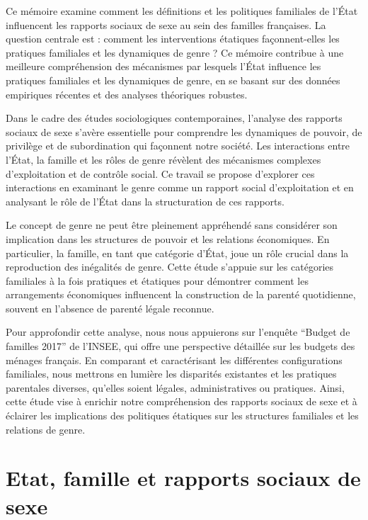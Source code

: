 \documentclass[
  12pt,
]{book}
\begin{document}
Ce mémoire examine comment les définitions et les politiques familiales
de l'État influencent les rapports sociaux de sexe au sein des familles
françaises. La question centrale est : comment les interventions
étatiques façonnent-elles les pratiques familiales et les dynamiques de
genre ? Ce mémoire contribue à une meilleure compréhension des
mécanismes par lesquels l'État influence les pratiques familiales et les
dynamiques de genre, en se basant sur des données empiriques récentes et
des analyses théoriques robustes.

Dans le cadre des études sociologiques contemporaines, l'analyse des
rapports sociaux de sexe s'avère essentielle pour comprendre les
dynamiques de pouvoir, de privilège et de subordination qui façonnent
notre société. Les interactions entre l'État, la famille et les rôles de
genre révèlent des mécanismes complexes d'exploitation et de contrôle
social. Ce travail se propose d'explorer ces interactions en examinant
le genre comme un rapport social d'exploitation et en analysant le rôle
de l'État dans la structuration de ces rapports.

Le concept de genre ne peut être pleinement appréhendé sans considérer
son implication dans les structures de pouvoir et les relations
économiques. En particulier, la famille, en tant que catégorie d'État,
joue un rôle crucial dans la reproduction des inégalités de genre. Cette
étude s'appuie sur les catégories familiales à la fois pratiques et
étatiques pour démontrer comment les arrangements économiques
influencent la construction de la parenté quotidienne, souvent en
l'absence de parenté légale reconnue.

Pour approfondir cette analyse, nous nous appuierons sur l'enquête
``Budget de familles 2017'' de l'INSEE, qui offre une perspective
détaillée sur les budgets des ménages français. En comparant et
caractérisant les différentes configurations familiales, nous mettrons
en lumière les disparités existantes et les pratiques parentales
diverses, qu'elles soient légales, administratives ou pratiques. Ainsi,
cette étude vise à enrichir notre compréhension des rapports sociaux de
sexe et à éclairer les implications des politiques étatiques sur les
structures familiales et les relations de genre.

\section{Etat, famille et rapports sociaux de
sexe}\label{etat-famille-et-rapports-sociaux-de-sexe}
\end{document}
